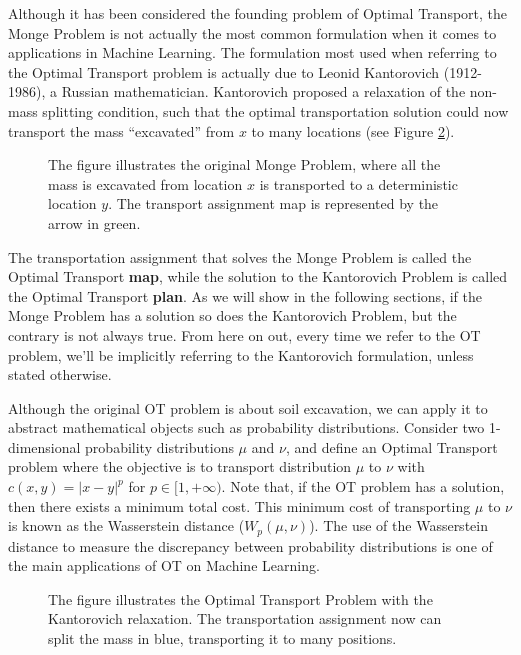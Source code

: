 Although it has been considered the founding problem of Optimal Transport, the Monge Problem is not actually the most
common formulation when it comes to applications in Machine Learning. The formulation most used when referring
to the Optimal Transport problem is actually due to Leonid Kantorovich (1912-1986), a Russian mathematician.
Kantorovich proposed a relaxation of the non-mass splitting condition, such that the optimal transportation
solution could now transport the mass ``excavated'' from $x$ to many locations
(see Figure \ref{fig:kantorovichproblem}).

\begin{figure}[H]
  \centering
  \def\svgscale{0.7}
  
  \caption{The figure illustrates the original Monge Problem, where all the mass is excavated from location
  $x$ is transported to a deterministic location $y$. The transport assignment map is represented by the arrow in green.}
  \label{fig:mongeproblem}
\end{figure}

The transportation assignment that solves the Monge Problem is called the Optimal Transport \textbf{map},
while the solution to the Kantorovich Problem is called the Optimal Transport \textbf{plan}. As we will show
in the following sections, if the Monge Problem has a solution so does the Kantorovich Problem,
but the contrary is not always true. From here
on out, every time we refer to the OT problem, we'll be implicitly referring to the Kantorovich formulation, unless
stated otherwise.

Although the original OT problem is about soil excavation, we can apply it to abstract mathematical objects
such as probability distributions. Consider two 1-dimensional probability distributions
$\mu$ and $\nu$, and define an Optimal Transport problem where the objective is to transport
distribution $\mu$ to $\nu$ with $c(x,y) = |x-y|^p$ for $p \in [1,+\infty)$.
Note that, if the OT problem has a solution, then there exists a minimum total cost. This minimum
cost of transporting $\mu$ to $\nu$ is known as the Wasserstein distance ($W_p(\mu,\nu)$).
The use of the Wasserstein distance to measure the discrepancy between probability distributions
is one of the main applications of OT on Machine Learning.

\begin{figure}[H]
  \centering
  \def\svgscale{0.7}
  
  \caption{The figure illustrates the Optimal Transport Problem with the Kantorovich relaxation.
  The transportation assignment now can split the mass in blue, transporting it to many positions.}
  \label{fig:kantorovichproblem}
\end{figure}


